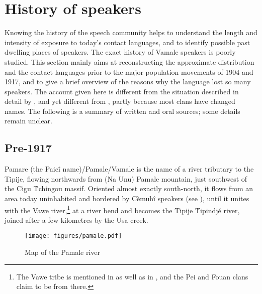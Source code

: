 \chapter{History of speakers}
\label{chap:Tipije}
\largerpage
Knowing the history of the speech community helps to understand the length and intensity of exposure to today's contact languages, and to identify possible past dwelling places of speakers. The exact history of Vamale speakers is poorly studied. This section mainly aims at reconstructing the approximate distribution and the contact languages prior to the major population movements of 1904 and 1917, and to give a brief overview of the reasons why the language lost so many speakers.
The account given here is different from the situation described in detail by \textcite[91--93]{guiart_donnees_1984}, and yet different from \textcite[20]{leenhardt_evenements_1978a}, partly because most clans have changed names. The following is a summary of written and oral sources; some details remain unclear.

\section{Pre-1917}
Pamare (the Paicî name)/Pamale/Vamale is the name of a river tributary to the Tipije, flowing northwards from (Na Unu) Pamale mountain, just southwest of the Cigu \~ Tchingou massif. Oriented almost exactly south-north, it flows from an area today uninhabited and bordered by Cèmuhî speakers (see ), until it unites with the Vawe river,\footnote{The Vawe tribe is mentioned in \textcite[26]{leenhardt_figures_1978} as well as in \textcite{sand_tiouande_2001}, and the Pei and Fouan clans claim to be from there.} at a river bend and becomes the Tipije \~ Tipindjé river, joined after a few kilometres by the Usa creek. 

\begin{figure}
	\texttt{[image: figures/pamale.pdf]}
	\caption{Map of the Pamale river}
	\label{map:pamale}
\end{figure}

